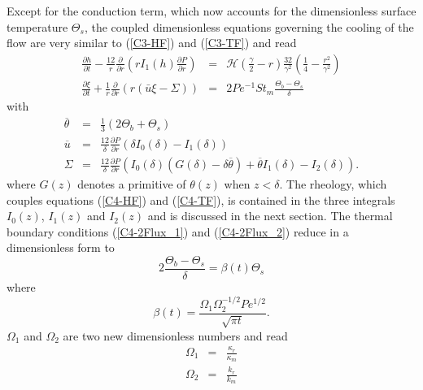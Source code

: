 Except  for   the  conduction  term,   which  now  accounts   for  the
dimensionless    surface   temperature    $\Theta_s$,   the    coupled
dimensionless equations  governing the  cooling of  the flow  are very
similar to (\ref{C3-HF}) and (\ref{C3-TF}) and read
\begin{eqnarray}
  \frac{\partial h}{\partial t}-\frac{12}{r}
  \frac{\partial}{\partial      r}
  \left( r I_1(h) \frac{\partial P}{\partial
  r}\right)
  \label{C4-HF}
  & =& \mathcal{H}(\frac{\gamma}{2}-r)\frac{32}{\gamma^{2}}\left(\frac{1}{4}-\frac{r^{2}}{\gamma^{2}}\right)\\
  \frac{\partial                                       \xi}{\partial
  t}+\frac{1}{r}\frac{\partial}{\partial                          r}
  \left( r\left(\bar{u}\xi-\Sigma\right)\right)&=&2Pe^{-1}St_m\frac{\Theta_b-\Theta_s}{\delta}\label{C4-TF}
\end{eqnarray}
with
\begin{eqnarray}
  \overline{\theta}&=&\frac{1}{3}\left(2\Theta_b+\Theta_s\right)\label{C4-tbar}\\
  \overline{u}&=&\frac{12}{\delta}
                  \frac{\partial
                  P}{\partial
                  r}\left(\delta
                  I_0(\delta)-I_1(\delta)\right)\\
  \Sigma &=& \frac{12}{\delta} \frac{\partial P}{\partial r}\left(I_0(\delta)\left(G(\delta)-\delta\overline{\theta}\right)+\overline{\theta}I_1(\delta)-I_2(\delta)\right).
\end{eqnarray}
where $G(z)$ denotes  a primitive of $\theta(z)$  when $z<\delta$. The
rheology, which couples equations  (\ref{C4-HF}) and (\ref{C4-TF}), is
contained in the  three integrals $I_0(z)$, $I_1(z)$  and $I_2(z)$ and
is discussed  in the  next section.   The thermal  boundary conditions
(\ref{C4-2Flux_1})  and (\ref{C4-2Flux_2})  reduce in  a dimensionless
form to
\begin{equation}
  2\frac{\Theta_b-\Theta_s}{\delta}               =   \beta(t)\Theta_s
  \label{C4-Boundary-Condi}
\end{equation}
where
\begin{equation}
  \beta(t) = \frac{\Omega_1\Omega_2^{-1/2} Pe^{1/2}}{\sqrt{\pi t}}.\label{C4_beta}
\end{equation}
$\Omega_1$ and $\Omega_2$ are two new dimensionless numbers and read
\begin{eqnarray}
  \Omega_1&=&\frac{\kappa_r}{\kappa_m}\label{C4-Omega1}\\
  \Omega_2&=&\frac{k_r}{k_m}\label{C4-Omega2}
\end{eqnarray}
